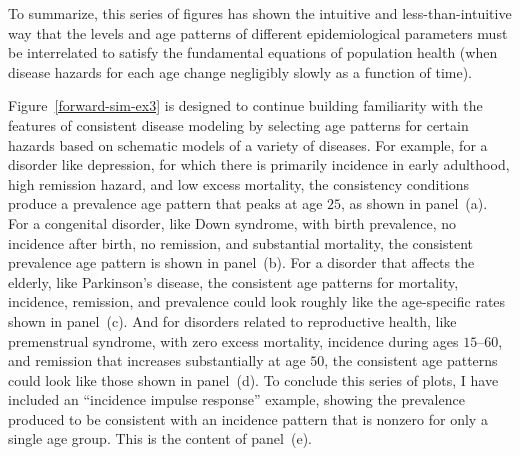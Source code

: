 To summarize, this series of figures has shown the intuitive and
less-than-intuitive way that the levels and age patterns of different
epidemiological parameters must be interrelated to satisfy the
fundamental equations of population health (when disease hazards for
each age change negligibly slowly as a function of time).

Figure~\ref{forward-sim-ex3} is designed to continue building familiarity with the
features of consistent disease modeling by selecting age patterns for
certain hazards based on schematic models of a variety of diseases.  For
example, for a disorder like depression, for which there is primarily
incidence in early adulthood, high remission hazard, and low excess
mortality, the consistency conditions produce a prevalence age pattern
that peaks at age $25$, as shown in panel~(a).
For a congenital disorder, like Down syndrome, with birth
prevalence, no incidence after birth, no remission, and substantial
mortality, the consistent prevalence age pattern is shown in
panel~(b).
For a disorder that affects the elderly, like Parkinson's disease, the
consistent age patterns for mortality, incidence, remission, and
prevalence could look roughly like the age-specific rates shown in
panel~(c).
And for disorders related to reproductive health, like premenstrual
syndrome, with zero excess mortality, incidence during ages $15$--$60$, and
remission that increases substantially at age $50$, the consistent age
patterns could look like those shown in
panel~(d).
To conclude this series of plots, I have included an ``incidence impulse
response'' example, showing the prevalence produced to be consistent
with an incidence pattern that is nonzero for only a single
age group. This is the content of
panel~(e).


